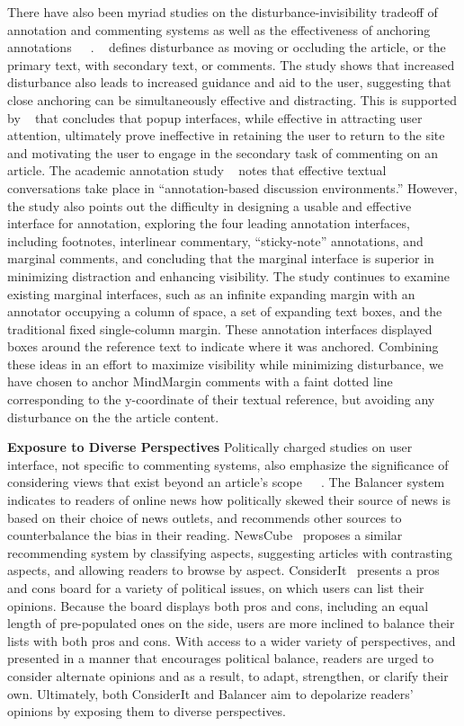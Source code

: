 There have also been myriad studies on the disturbance-invisibility tradeoff of annotation and commenting systems as well as the effectiveness of anchoring annotations~\cite{FluidDocs}~\cite{Wikipedia}~\cite{AnnotationsStudents}. ~\cite{FluidDocs} defines disturbance as moving or occluding the article, or the primary text, with secondary text, or comments. The study shows that increased disturbance also leads to increased guidance and aid to the user, suggesting that close anchoring can be simultaneously effective and distracting. This is supported by ~\cite{Wikipedia} that concludes that popup interfaces, while effective in attracting user attention, ultimately prove ineffective in retaining the user to return to the site and motivating the user to engage in the secondary task of commenting on an article.  The academic annotation study ~\cite{AnnotationsStudents} notes that effective textual conversations take place in “annotation-based discussion environments.” However, the study also points out the difficulty in designing a usable and effective interface for annotation, exploring the four leading annotation interfaces, including footnotes, interlinear commentary, “sticky-note” annotations, and marginal comments, and concluding that the marginal interface is superior in minimizing distraction and enhancing visibility. The study continues to examine existing marginal interfaces, such as an infinite expanding margin with an annotator occupying a column of space, a set of expanding text boxes, and the traditional fixed single-column margin. These annotation interfaces displayed boxes around the reference text to indicate where it was anchored. Combining these ideas in an effort to maximize visibility while minimizing disturbance, we have chosen to anchor MindMargin comments with a faint dotted line corresponding to the y-coordinate of their textual reference, but avoiding any disturbance on the the article content. 

\textbf{Exposure to Diverse Perspectives}
Politically charged studies on user interface, not specific to commenting systems, also emphasize the significance of considering views that exist beyond an article’s scope~\cite{Politics}~\cite{NewsCube}~\cite{ConsiderIt}. The Balancer system~\cite{Politics} indicates to readers of online news how politically skewed their source of news is based on their choice of news outlets, and recommends other sources to counterbalance the bias in their reading. NewsCube~\cite{NewsCube} proposes a similar recommending system by classifying aspects, suggesting articles with contrasting aspects, and allowing readers to browse by aspect. ConsiderIt~\cite{ConsiderIt} presents a pros and cons board for a variety of political issues, on which users can list their opinions. Because the board displays both pros and cons, including an equal length of pre-populated ones on the side, users are more inclined to balance their lists with both pros and cons. With access to a wider variety of perspectives, and presented in a manner that encourages political balance, readers are urged to consider alternate opinions and as a result, to adapt, strengthen, or clarify their own. Ultimately, both ConsiderIt and Balancer aim to depolarize readers’ opinions by exposing them to diverse perspectives.


